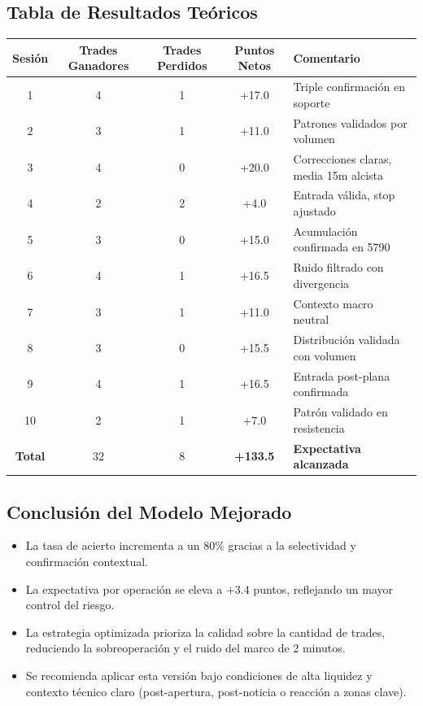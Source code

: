 \subsection{Tabla de Resultados Te\'{o}ricos}

\begin{center}
    \begin{tabularx}{\textwidth}{|c|c|c|c|X|}
        \hline
        \textbf{Sesión} & \textbf{Trades Ganadores} & \textbf{Trades Perdidos} & \textbf{Puntos Netos} & \textbf{Comentario} \\
        \hline
        1 & 4 & 1 & +17.0 & Triple confirmación en soporte \\
        2 & 3 & 1 & +11.0 & Patrones validados por volumen \\
        3 & 4 & 0 & +20.0 & Correcciones claras, media 15m alcista \\
        4 & 2 & 2 & +4.0 & Entrada válida, stop ajustado \\
        5 & 3 & 0 & +15.0 & Acumulación confirmada en 5790 \\
        6 & 4 & 1 & +16.5 & Ruido filtrado con divergencia \\
        7 & 3 & 1 & +11.0 & Contexto macro neutral \\
        8 & 3 & 0 & +15.5 & Distribución validada con volumen \\
        9 & 4 & 1 & +16.5 & Entrada post-plana confirmada \\
        10 & 2 & 1 & +7.0 & Patrón validado en resistencia \\
        \hline
        \textbf{Total} & 32 & 8 & \textbf{+133.5} & \textbf{Expectativa alcanzada} \\
        \hline
    \end{tabularx}
\end{center}
    

\subsection{Conclusión del Modelo Mejorado}

\begin{itemize}
    \item La tasa de acierto incrementa a un $80\%$ gracias a la selectividad y confirmación contextual.
    \item La expectativa por operación se eleva a $+3.4$ puntos, reflejando un mayor control del riesgo.
    \item La estrategia optimizada prioriza la calidad sobre la cantidad de trades, reduciendo la sobreoperación y el ruido del marco de 2 minutos.
    \item Se recomienda aplicar esta versión bajo condiciones de alta liquidez y contexto técnico claro (post-apertura, post-noticia o reacción a zonas clave).
\end{itemize}

